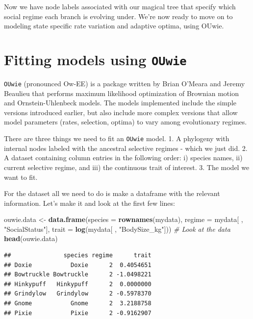\documentclass[]{book}
\newenvironment{Shaded}{\begin{snugshade}}{\end{snugshade}}
\newcommand{\KeywordTok}[1]{\textcolor[rgb]{0.13,0.29,0.53}{\textbf{{#1}}}}
\newcommand{\DataTypeTok}[1]{\textcolor[rgb]{0.13,0.29,0.53}{{#1}}}
\newcommand{\StringTok}[1]{\textcolor[rgb]{0.31,0.60,0.02}{{#1}}}
\newcommand{\CommentTok}[1]{\textcolor[rgb]{0.56,0.35,0.01}{\textit{{#1}}}}
\newcommand{\NormalTok}[1]{{#1}}
\begin{document}
Now we have node labels associated with our magical tree that specify
which social regime each branch is evolving under. We're now ready to
move on to modeling state specific rate variation and adaptive optima,
using OUwie.

\section{\texorpdfstring{Fitting models using
\texttt{OUwie}}{Fitting models using OUwie}}\label{fitting-models-using-ouwie}

\texttt{OUwie} (pronounced Ow-EE) is a package written by Brian O'Meara
and Jeremy Beaulieu that performs maximum likelihood optimization of
Brownian motion and Ornstein-Uhlenbeck models. The models implemented
include the simple versions introduced earlier, but also include more
complex versions that allow model parameters (rates, selection, optima)
to vary among evolutionary regimes.

There are three things we need to fit an \texttt{OUwie} model. 1. A
phylogeny with internal nodes labeled with the ancestral selective
regimes - which we just did. 2. A dataset containing column entries in
the following order: i) species names, ii) current selective regime, and
iii) the continuous trait of interest. 3. The model we want to fit.

For the dataset all we need to do is make a dataframe with the relevant
information. Let's make it and look at the first few lines:

\begin{Shaded}
\begin{Highlighting}[]
\NormalTok{ouwie.data <-}\StringTok{ }\KeywordTok{data.frame}\NormalTok{(}\DataTypeTok{species =} \KeywordTok{rownames}\NormalTok{(mydata), }\DataTypeTok{regime =} \NormalTok{mydata[ , }\StringTok{"SocialStatus"}\NormalTok{],}
\DataTypeTok{trait =} \KeywordTok{log}\NormalTok{(mydata[ , }\StringTok{"BodySize_kg"}\NormalTok{]))}
\CommentTok{# Look at the data}
\KeywordTok{head}\NormalTok{(ouwie.data)}
\end{Highlighting}
\end{Shaded}

\begin{verbatim}
##               species regime      trait
## Doxie           Doxie      2  0.4054651
## Bowtruckle Bowtruckle      2 -1.0498221
## Hinkypuff   Hinkypuff      2  0.0000000
## Grindylow   Grindylow      2 -0.5978370
## Gnome           Gnome      2  3.2188758
## Pixie           Pixie      2 -0.9162907
\end{verbatim}
\end{document}
